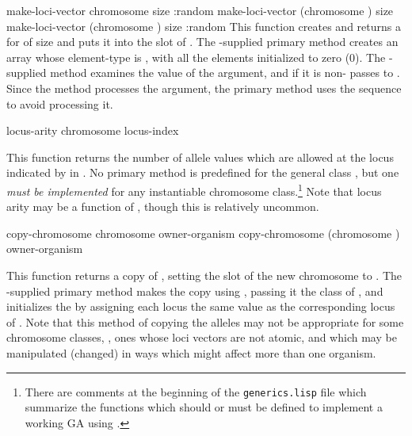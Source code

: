 {\filbreak

{\samepage

\Defgeneric make-loci-vector {chromosome size \key :random}
 make-loci-vector {(chromosome ) size \key \allow}
 make-loci-vector {(chromosome ) size
                                   \key :random}
	\label{chromosome:make-loci-vector}
This function creates and returns a  for  of size 
and puts it into the  slot of . The \geco-supplied
primary method creates an array whose element-type is , with all the
elements initialized to zero (0). The \geco-supplied  method examines
the value of the  argument, and if it is non- passes
 to . Since the  method
processes the  argument, the primary method uses the \key \allow
sequence to avoid processing it.
\par}%

\filbreak
{\samepage
\Defgeneric locus-arity {chromosome locus-index}

This function returns the number of allele values which are allowed at the locus
indicated by  in . No primary method is predefined
for the general class , but one {\em must be implemented} for any
instantiable chromosome class.\footnote{There are comments at the beginning of the
{\tt generics.lisp} file which summarize the functions which should or must be
defined to implement a working GA using \geco.} Note that locus arity may be a
function of , though this is relatively uncommon.
\par}%

\filbreak
{\samepage
\Defgeneric copy-chromosome {chromosome owner-organism}
 copy-chromosome {(chromosome ) owner-organism}

This function returns a copy of , setting the 
slot of the new chromosome to . The \geco-supplied primary
method makes the copy using , passing it the class of
, and initializes the  by assigning each locus the
same value as the corresponding locus of . Note that this method of
copying the alleles may not be appropriate for some chromosome classes, \eg, ones
whose loci vectors are not atomic, and which may be manipulated (changed) in ways
which might affect more than one organism.
\par}%

}
